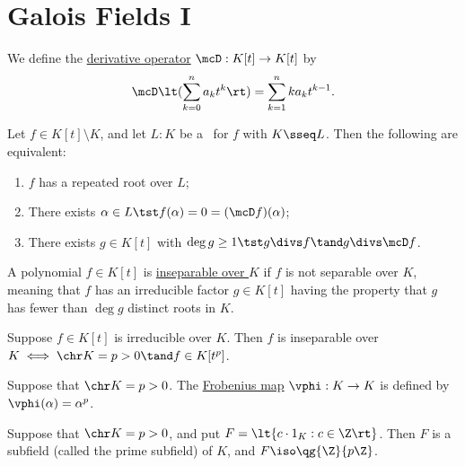\documentclass[a4paper]{article}
\begin{document}
\section{Galois Fields I}
\begin{tdefinition}
  We define the \ul{derivative operator} \( \mcD:K[t]\to K[t] \) by \begin{align*}
    \mcD\lt(\sum_{k=0}^{n}a_kt^k\rt) = \sum_{k=1}^{n}ka_kt^{k-1}.
  \end{align*}
\end{tdefinition}

\begin{ttheorem}
  Let \( f\in K[t]\setminus K \), and let \( L:K \) be a \sfe~for \( f \) with \( K\sseq L \).
  Then the following are equivalent: \begin{enumerate}[label=(\roman*)]
    \item \( f \) has a repeated root over \( L \);
    \item There exists \( \alpha\in L \tst f(\alpha)=0=(\mcD f)(\alpha) \);
    \item There exists \( g\in K[t] \) with \( \deg g \geq 1 \tst g \divs f \tand g\divs\mcD f \).
  \end{enumerate}
\end{ttheorem}

\begin{tdefinition}[Inseparable]
  A polynomial \( f \in K[t] \) is \ul{inseparable over \( K \)} if \( f \) is not separable over \( K \), meaning that \( f \) has an irreducible factor \( g \in K[t] \) having the property that \( g \) has fewer than \( \deg g \) distinct roots in \( K \).
\end{tdefinition}

\begin{ttheorem}
  Suppose \( f\in K[t] \) is irreducible over \( K \).
  Then \( f \) is inseparable over \( K \iff \chr K=p>0 \tand f \in K[t^p]\).
\end{ttheorem}

\begin{tdefinition}
  Suppose that \( \chr K = p > 0 \).
  The \ul{Frobenius map} \( \vphi:K\to K \) is defined by \( \vphi(\alpha)=\alpha^p \).
\end{tdefinition}

\begin{ttheorem}
  Suppose that \( \chr K = p > 0 \), and put \( F=\lt\{ c\cdot 1_K : c\in \Z \rt\} \).
  Then \( F \) is a subfield (called the prime subfield) of \( K \), and \( F\iso \qg{\Z}{p\Z} \).
\end{ttheorem}
\end{document}
